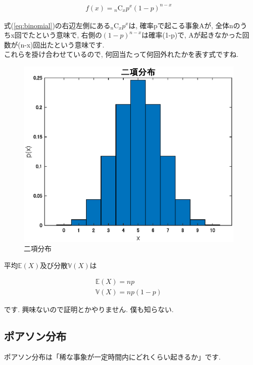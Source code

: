 \documentclass[11pt,a4paper,uplatex]{ujreport} 	%
\begin{document}
\begin{align}
\label{eq:binomial}
f(x) = {}_n\mathrm{C}_x p^x(1-p)^{n-x}
\end{align}

式(\ref{eq:binomial})の右辺左側にある${}_n\mathrm{C}_x p^x$は, 確率pで起こる事象Aが, 全体nのうちx回でたという意味で, 右側の$(1-p)^{n-x}$は確率(1-p)で, Aが起きなかった回数が(n-x)回出たという意味です.\\

これらを掛け合わせているので, 何回当たって何回外れたかを表す式ですね.

\begin{figure}[H]
\label{im:bino}
  \centering
  \includegraphics[width=15cm]{../figures/binomial.eps}
  \caption{二項分布}
\end{figure}

平均$\mathbb{E}(X)$及び分散$\mathbb{V}(X)$は

\begin{align}
\mathbb{E}(X) = np\\
\mathbb{V}(X) = np(1-p)
\end{align}

です. 興味ないので証明とかやりません. 僕も知らない.

\subsection{ポアソン分布}
ポアソン分布は「稀な事象が一定時間内にどれくらい起きるか」です.\\
\end{document}
